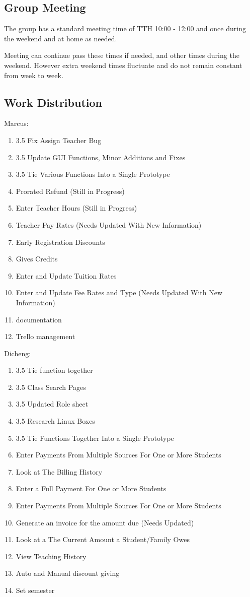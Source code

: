\subsection{Group Meeting}

The group has a standard meeting time of TTH 10:00 - 12:00 and once during the weekend and at home as needed.  

Meeting can continue pass these times if needed, and other times during the weekend. However extra weekend times fluctuate and do not remain constant from week to week. 

\subsection{Work Distribution}

Marcus:
\begin{enumerate}
\item 3.5 Fix Assign Teacher Bug
\item 3.5 Update GUI Functions, Minor Additions and Fixes
\item 3.5 Tie Various Functions Into a Single Prototype
\item Prorated Refund (Still in Progress)
\item Enter Teacher Hours (Still in Progress)
\item Teacher Pay Rates (Needs Updated With New Information)
\item Early Registration Discounts
\item Gives Credits
\item Enter and Update Tuition Rates
\item Enter and Update Fee Rates and Type (Needs Updated With New Information)
\item documentation
\item Trello management\\
\end{enumerate}

Dicheng:
\begin{enumerate}
\item 3.5 Tie function together
\item 3.5 Class Search Pages
\item 3.5 Updated Role sheet
\item 3.5 Research Linux Boxes
\item 3.5 Tie Functions Together Into a Single Prototype
\item Enter Payments From Multiple Sources For One or More Students
\item Look at The Billing History
\item Enter a Full Payment For One or More Students
\item Enter Payments From Multiple Sources For One or More Students
\item Generate an invoice for the amount due (Needs Updated)
\item Look at a The Current Amount a Student/Family Owes
\item View Teaching History
\item Auto and Manual discount giving
\item Set semester
\end{enumerate}


